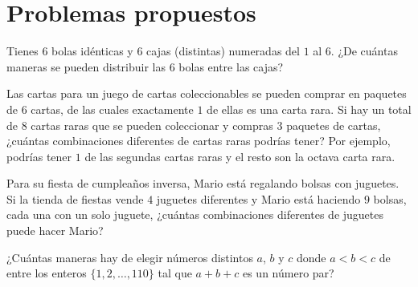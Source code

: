 \documentclass[12pt]{article}
\begin{document}
\section{Problemas propuestos}
\begin{problema}
Tienes $6$ bolas idénticas y $6$ cajas (distintas) numeradas del $1$ al $6$. ¿De cuántas maneras se pueden distribuir las $6$ bolas entre las cajas?
\end{problema}
\begin{problema}
Las cartas para un juego de cartas coleccionables se pueden comprar en paquetes de $6$ cartas, de las cuales exactamente $1$ de ellas es una carta rara. Si hay un total de $8$ cartas raras que se pueden coleccionar y compras $3$ paquetes de cartas, ¿cuántas combinaciones diferentes de cartas raras podrías tener? Por ejemplo, podrías tener $1$ de las segundas cartas raras y el resto son la octava carta rara.
\end{problema}

\begin{problema}
Para su fiesta de cumpleaños inversa, Mario está regalando bolsas con juguetes. Si la tienda de fiestas vende $4$ juguetes diferentes y Mario está haciendo $9$ bolsas, cada una con un solo juguete, ¿cuántas combinaciones diferentes de juguetes puede hacer Mario?
\end{problema}

\begin{problema}
¿Cuántas maneras hay de elegir números distintos $a$, $b$ y $c$ donde $a < b < c$ de entre los enteros $\{1, 2, \ldots, 110\}$ tal que $a+b+c$ es un número par?
\end{problema}
\end{document}
